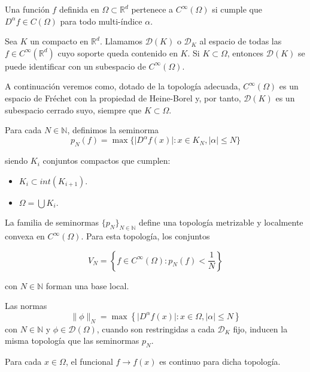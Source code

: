 \begin{definicion}
Una función $f$ definida en $\Omega \subset \mathds{R}^{d}$ pertenece a $C^{\infty}(\Omega)$ si cumple que $D^{\alpha}f\in C(\Omega)$ para todo multi-índice $\alpha$.
\end{definicion}

\begin{definicion}
Sea $K$ un compacto en $\mathds{R}^{d}$. Llamamos $\mathcal{D}(K)$ o $\mathcal{D}_K$ al espacio de todas las $f\in C^{\infty}(\mathds{R}^{d})$ cuyo soporte queda contenido en $K$. Si $K\subset\Omega$, entonces $\mathcal{D}(K)$ se puede identificar con un subespacio de $C^{\infty}(\Omega)$.

A continuación veremos como, dotado de la topología adecuada, $C^{\infty}(\Omega)$ es un espacio de Fréchet con la propiedad de Heine-Borel y, por tanto, $\mathcal{D}(K)$ es un subespacio cerrado suyo, siempre que $K\subset\Omega$.


Para cada $N\in\mathds{N}$, definimos la seminorma 
\begin{equation}
p_{N}(f) = \max \{ \vert D^{\alpha}f(x)\vert : x\in K_{N}, \vert\alpha\vert \leq N\}
\end{equation}

siendo $K_{i}$ conjuntos compactos que cumplen:
\begin{itemize}
	\item $K_{i} \subset int(K_{i+1})$.
	\item $\Omega = \bigcup K_{i}$.	
\end{itemize}
\end{definicion}

\begin{lema}
La familia de seminormas $\{p_{N}\}_{N\in\mathds{N}}$ define una topología metrizable y localmente convexa en $C^{\infty}(\Omega)$. Para esta topología, los conjuntos 

\begin{equation}
 V_{N} = \left\{ f \in C^{\infty}(\Omega): p_{N}(f) < \frac{1}{N}\right\}
\end{equation}

con $N\in\mathds{N}$ forman una base local.
\end{lema}


\begin{observacion}
    Las normas 
\begin{equation}
    \parallel \phi \parallel_N = \max \left\{ \vert D^{\alpha}f(x)\vert : x\in \Omega, \vert\alpha\vert \leq N\right\}
\end{equation}
con $N\in\mathds{N}$ y $\phi\in\mathcal{D}(\Omega)$, cuando son restringidas a cada $\mathcal{D}_K$ fijo, inducen la misma topología que las seminormas $p_N$.
\end{observacion}
\begin{observacion}
Para cada $x\in\Omega$, el funcional $f\rightarrow f(x)$ es continuo para dicha topología.
\end{observacion}


